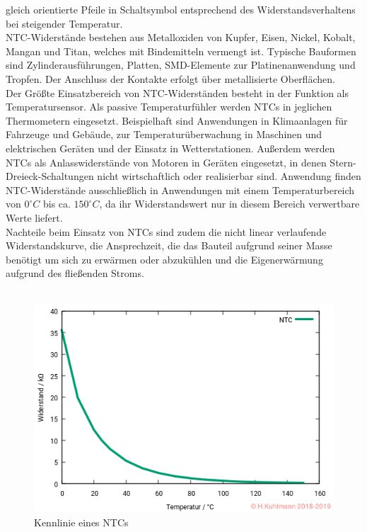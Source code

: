 gleich orientierte Pfeile in Schaltsymbol entsprechend des Widerstandsverhaltens bei steigender
Temperatur.\\
NTC-Widerstände bestehen aus Metalloxiden von Kupfer, Eisen, Nickel, Kobalt, Mangan und Titan,
welches mit Bindemitteln vermengt ist. Typische Bauformen sind Zylinderausführungen, Platten,
SMD-Elemente zur Platinenanwendung und Tropfen. Der Anschluss der Kontakte erfolgt über
metallisierte Oberflächen.\\
Der Größte Einsatzbereich von NTC-Widerständen besteht in der Funktion als Temperatursensor. Als
passive Temperaturfühler werden NTCs in jeglichen Thermometern eingesetzt. Beispielhaft sind
Anwendungen in Klimaanlagen für Fahrzeuge und Gebäude, zur Temperaturüberwachung in
Maschinen und elektrischen Geräten und der Einsatz in Wetterstationen. Außerdem werden NTCs als
Anlasswiderstände von Motoren in Geräten eingesetzt, in denen Stern-Dreieck-Schaltungen nicht
wirtschaftlich oder realisierbar sind. Anwendung finden NTC-Widerstände ausschließlich in
Anwendungen mit einem Temperaturbereich von $0^{\circ} C$ bis ca. $150^{\circ} C$, da ihr Widerstandswert nur in
diesem Bereich verwertbare Werte liefert.\\
Nachteile beim Einsatz von NTCs sind zudem die nicht linear verlaufende Widerstandskurve, die
Ansprechzeit, die das Bauteil aufgrund seiner Masse benötigt um sich zu erwärmen oder abzukühlen
und die Eigenerwärmung aufgrund des fließenden Stroms.\\
\\
\begin{figure}[htb]
    \includegraphics[width=13cm]{./res/NTC_Kennlinie}
    \caption{Kennlinie eines NTCs}
    \label{fig:NTCKenn}
\end{figure}

